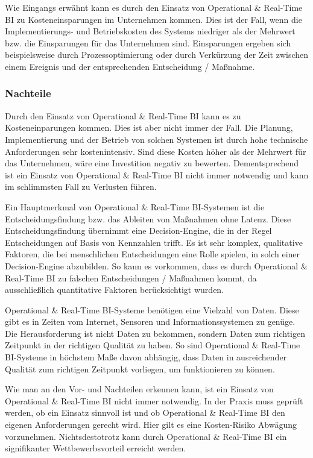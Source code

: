 Wie Eingangs erwähnt kann es durch den Einsatz von Operational \& Real-Time BI zu Kosteneinsparungen im Unternehmen kommen. Dies ist der Fall, wenn die Implementierungs- und Betriebskosten des Systems niedriger als der Mehrwert bzw. die Einsparungen für das Unternehmen sind. \autocite[Vgl.][2]{richard} Einsparungen ergeben sich beispielsweise durch Prozessoptimierung oder durch Verkürzung der Zeit zwischen einem Ereignis und der entsprechenden Entscheidung / Maßnahme. 

\subsubsection{Nachteile}
Durch den Einsatz von Operational \& Real-Time BI kann es zu Kosteneinparungen kommen. Dies ist aber nicht immer der Fall. Die Planung, Implementierung und der Betrieb von solchen Systemen ist durch hohe technische Anforderungen sehr kostenintensiv. \autocite[Vgl.][S. 36]{Sandu2008} Sind diese Kosten höher als der Mehrwert für das Unternehmen, wäre eine Investition negativ zu bewerten. Dementsprechend ist ein Einsatz von Operational \& Real-Time BI nicht immer notwendig und kann im schlimmsten Fall zu Verlusten führen.

Ein Hauptmerkmal von Operational \& Real-Time BI-Systemen ist die Entscheidungsfindung bzw. das Ableiten von Maßnahmen ohne Latenz. Diese Entscheidungsfindung übernimmt eine Decision-Engine, die in der Regel Entscheidungen auf Basis von Kennzahlen trifft. Es ist sehr komplex, qualitative Faktoren, die bei menschlichen Entscheidungen eine Rolle spielen, in solch einer Decision-Engine abzubilden.\autocite[Vgl.][4]{Azvine2006} So kann es vorkommen, dass es durch Operational \& Real-Time BI zu falschen Entscheidungen / Maßnahmen kommt, da ausschließlich quantitative Faktoren berücksichtigt wurden.

Operational \& Real-Time BI-Systeme benötigen eine Vielzahl von Daten. Diese gibt es in Zeiten vom Internet, Sensoren und Informationssystemen zu genüge. Die Herausforderung ist nicht Daten zu bekommen, sondern Daten zum richtigen Zeitpunkt in der richtigen Qualität zu haben. \autocite[Vgl.][160]{Azvine2007} So sind Operational \& Real-Time BI-Systeme in höchstem Maße davon abhängig, dass Daten in ausreichender Qualität zum richtigen Zeitpunkt vorliegen, um funktionieren zu können. 

Wie man an den Vor- und Nachteilen erkennen kann, ist ein Einsatz von Operational \& Real-Time BI nicht immer notwendig. In der Praxis muss geprüft werden, ob ein Einsatz sinnvoll ist und ob Operational \& Real-Time BI den eigenen Anforderungen gerecht wird. Hier gilt es eine Kosten-Risiko Abwägung vorzunehmen. Nichtsdestotrotz kann durch Operational \& Real-Time BI ein signifikanter Wettbewerbsvorteil erreicht werden. 